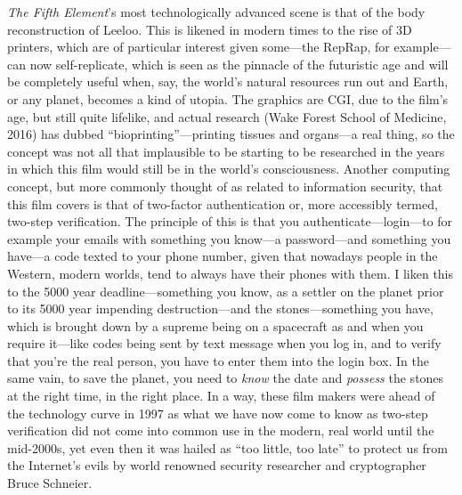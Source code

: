 \documentclass[12pt,a4paper]{article}
\begin{document}
\textit{The Fifth Element}'s most technologically advanced scene is
that of the body reconstruction of Leeloo. This is likened in modern
times to the rise of 3D printers, which are of particular interest
given some---the RepRap, for example---can now self-replicate, which
is seen as the pinnacle of the futuristic age and will be completely
useful when, say, the world's natural resources run out and Earth, or
any planet, becomes a kind of utopia. The graphics are CGI, due to the
film's age, but still quite lifelike, and actual research (Wake Forest
School of Medicine, 2016) has dubbed ``bioprinting''---printing
tissues and organs---a real thing, so the concept was not all that
implausible to be starting to be researched in the years in which this
film would still be in the world's consciousness. Another computing
concept, but more commonly thought of as related to information
security, that this film covers is that of two-factor authentication
or, more accessibly termed, two-step verification. The principle of
this is that you authenticate---login---to for example your emails
with something you know---a password---and something you have---a code
texted to your phone number, given that nowadays people in the
Western, modern worlds, tend to always have their phones with them. I
liken this to the 5000 year deadline---something you know, as a
settler on the planet prior to its 5000 year impending
destruction---and the stones---something you have, which is brought
down by a supreme being on a spacecraft as and when you require
it---like codes being sent by text message when you log in, and to
verify that you're the real person, you have to enter them into the
login box. In the same vain, to save the planet, you need to
\textit{know} the date and \textit{possess} the stones at the right
time, in the right place. In a way, these film makers were ahead of
the technology curve in 1997 as what we have now come to know as
two-step verification did not come into common use in the modern, real
world until the mid-2000s, yet even then it was hailed as ``too little,
too late'' to protect us from the Internet's evils by world renowned
security researcher and cryptographer Bruce Schneier.\\
\end{document}
